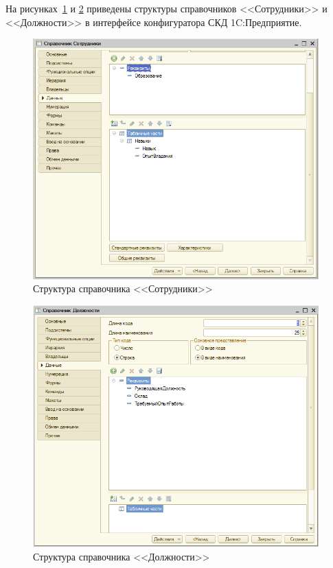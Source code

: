 \pagebreak

На рисунках~\ref{fig:employees} и \ref{fig:positions} приведены
структуры справочников <<Сотрудники>> и <<Должности>> в интерфейсе
конфигуратора СКД 1C:Предприятие.

\begin{figure}[h!]
  \centering
  \includegraphics[width=110mm]{pic/employees}
  \caption{Структура справочника <<Сотрудники>>}
  \label{fig:employees}
\end{figure}

\begin{figure}[h!]
  \centering
  \includegraphics[width=110mm]{pic/positions}
  \caption{Структура справочника <<Должности>>}
  \label{fig:positions}
\end{figure}

\newpage

